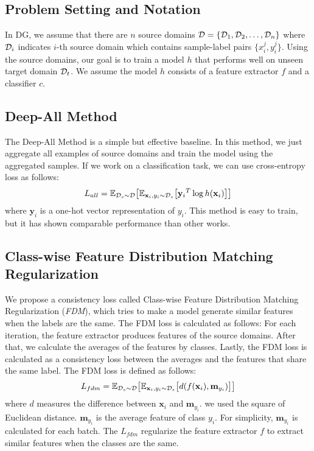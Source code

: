 \subsection{Problem Setting and Notation}
In DG, we assume that there are $n$ source domains $\mathcal{D} = \{\mathcal{D}_1, \mathcal{D}_2, \dots, \mathcal{D}_n\}$ where $\mathcal{D}_i$ indicates $i$-th source domain which contains sample-label pairs $\{x_i^j, y_i^j\}$. Using the source domains, our goal is to train a model $h$ that performs well on unseen target domain $\mathcal{D}_t$. We assume the model $h$ consists of a feature extractor $f$ and a classifier $c$. 

\subsection{Deep-All Method}
The Deep-All Method is a simple but effective baseline. In this method, we just aggregate all examples of source domains and train the model using the aggregated samples. If we work on a classification task, we can use cross-entropy loss as follows:
\begin{equation}
\label{eq:agg}
\begin{aligned}
L_{all} = \mathbb{E}_{\mathcal{D}_s\sim\mathcal{D}} \big[ \mathbb{E}_{\mathbf{x}_i,y_i\sim \mathcal{D}_s} \big[  {\mathbf{y}_i}^{T} \log h(\mathbf{x}_i) \big] \big]
\end{aligned}
\end{equation}
where $\mathbf{y}_i$ is a one-hot vector representation of $y_i$. This method is easy to train, but it has shown comparable performance than other works.

\subsection{Class-wise Feature Distribution Matching Regularization}
We propose a consistency loss called Class-wise Feature Distribution Matching Regularization (\textit{FDM}), which tries to make a model generate similar features when the labels are the same. The FDM loss is calculated as follows: For each iteration, the feature extractor produces features of the source domains. After that, we calculate the averages of the features by classes. Lastly, the FDM loss is calculated as a consistency loss between the averages and the features that share the same label. The FDM loss is defined as follows:
\begin{equation}
\label{eq:fdm}
\begin{aligned}
L_{fdm} = \mathbb{E}_{\mathcal{D}_s\sim\mathcal{D}} \big[ \mathbb{E}_{\mathbf{x}_i,y_i\sim \mathcal{D}_s} \big[  d(f(\mathbf{x}_i), \mathbf{m}_{y_i}) \big] \big]
\end{aligned}
\end{equation}
where $d$ measures the difference between $\mathbf{x}_i$ and $\mathbf{m}_{y_i}$. we used the square of Euclidean distance. $\mathbf{m}_{y_i}$ is the average feature of class $y_i$. For simplicity, $\mathbf{m}_{y_i}$ is calculated for each batch. The $L_{fdm}$ regularize the feature extractor $f$ to extract similar features when the classes are the same.

